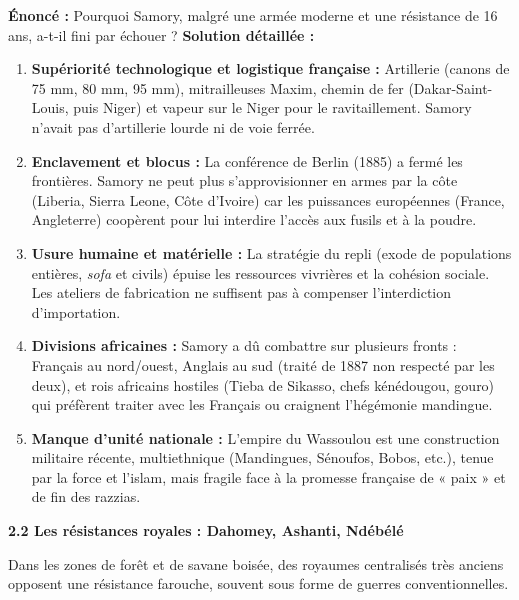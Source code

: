 \documentclass[11pt]{article}
\begin{document}
\begin{exoresolu}
\textbf{Énoncé :} Pourquoi Samory, malgré une armée moderne et une résistance de 16 ans, a-t-il fini par échouer ?
\textbf{Solution détaillée :}
\begin{enumerate}
    \item \textbf{Supériorité technologique et logistique française :} Artillerie (canons de 75 mm, 80 mm, 95 mm), mitrailleuses Maxim, chemin de fer (Dakar-Saint-Louis, puis Niger) et vapeur sur le Niger pour le ravitaillement. Samory n'avait pas d'artillerie lourde ni de voie ferrée.
    \item \textbf{Enclavement et blocus :} La conférence de Berlin (1885) a fermé les frontières. Samory ne peut plus s'approvisionner en armes par la côte (Liberia, Sierra Leone, Côte d'Ivoire) car les puissances européennes (France, Angleterre) coopèrent pour lui interdire l'accès aux fusils et à la poudre.
    \item \textbf{Usure humaine et matérielle :} La stratégie du repli (exode de populations entières, \emph{sofa} et civils) épuise les ressources vivrières et la cohésion sociale. Les ateliers de fabrication ne suffisent pas à compenser l'interdiction d'importation.
    \item \textbf{Divisions africaines :} Samory a dû combattre sur plusieurs fronts : Français au nord/ouest, Anglais au sud (traité de 1887 non respecté par les deux), et rois africains hostiles (Tieba de Sikasso, chefs kénédougou, gouro) qui préfèrent traiter avec les Français ou craignent l'hégémonie mandingue.
    \item \textbf{Manque d'unité nationale :} L'empire du Wassoulou est une construction militaire récente, multiethnique (Mandingues, Sénoufos, Bobos, etc.), tenue par la force et l'islam, mais fragile face à la promesse française de « paix » et de fin des razzias.
\end{enumerate}
\end{exoresolu}

\textbf{2.2 Les résistances royales : Dahomey, Ashanti, Ndébélé}

Dans les zones de forêt et de savane boisée, des royaumes centralisés très anciens opposent une résistance farouche, souvent sous forme de guerres conventionnelles.
\end{document}
